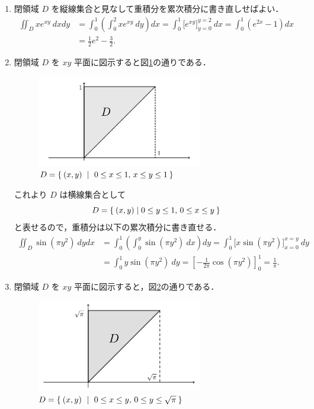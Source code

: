 \documentclass[11pt, uplatex, dvipdfmx]{jsarticle}
\begin{document}

   
   \begin{enumerate}[(1)]
     \setlength{\itemsep}{.1in}
     
   \item 閉領域 $D$ を縦線集合と見なして重積分を累次積分に書き直しせばよい．
     \begin{align*}
       \iint_D xe^{xy} \ dx dy 
       & = \int_{0}^{1} \left(\int_{0}^{2} x e^{xy} \ dy \right)dx
         = \int_{0}^{1} \Big[ e^{xy} \Big]_{y=0}^{y=2} \ dx
         = \int_{0}^{1} \left(e^{2x} - 1 \right) dx\\
       &= \frac{1}{2}e^2 - \frac{3}{2}.
     \end{align*}
     
   \item 閉領域 $D$ を $xy$ 平面に図示すると図\ref{fig:no2}の通りである．
     \begin{figure}[h]
       \centering
       \includegraphics[height=4cm]{./pictures/no2.pdf}
       \caption{$D=\Set{ (x,y) \ | \ 0 \leq x \leq 1, \, x \leq y \leq 1 }$}\label{fig:no2}
     \end{figure}
     
     これより $D$ は横線集合として
     \[
       D= \Set{ (x,y)  |  0 \leq y \leq 1, \, 0 \leq x \leq y}
     \]
     と表せるので，重積分は以下の累次積分に書き直せる．
     \begin{align*}
       \iint_{D} \sin \left( \pi y^2\right) \ dy dx
       &= \int_{0}^{1} \left(\int_{0}^{y} \sin (\pi y^2) \ dx \right) dy
         = \int_{0}^{1} \Big[ x \sin (\pi y^2) \Big]_{x=0}^{x=y} \ dy\\
       &=\int_{0}^{1} y \sin (\pi y^2) \ dy = \left[-\frac{1}{2\pi}
         \cos (\pi y^2) \right]_{0}^{1}=\frac{1}{\pi}.
     \end{align*}
     
   \item 閉領域 $D$ を $xy$ 平面に図示すると，図\ref{fig:no3}の通りである．
     \begin{figure}[h]
       \centering
       \includegraphics[height=4cm]{./pictures/no3.pdf}
       \caption{$D=\Set{ (x,y) \ | \ 0 \leq x \leq y, \, 0 \leq y \leq \sqrt{\pi} }$}\label{fig:no3}
     \end{figure}
     

\end{enumerate}
\end{document}
